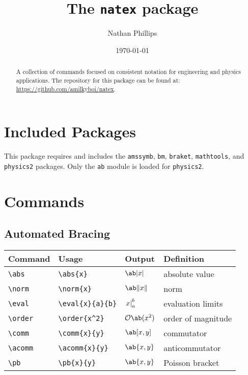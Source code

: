\documentclass[11pt]{article}
\title{The \texttt{natex} package}
\author{Nathan Phillips}
\date{\today}
\begin{document}
\maketitle

\begin{abstract}
    A collection of commands focused on consistent notation for engineering and physics applications. The repository for this package can be found at: \url{https://github.com/amilkyboi/natex}.
\end{abstract}

\tableofcontents

\newpage
\section{Included Packages}

This package requires and includes the \verb|amssymb|, \verb|bm|, \verb|braket|, \verb|mathtools|, and \verb|physics2| packages. Only the \verb|ab| module is loaded for \verb|physics2|.

\newpage
\section{Commands}

\subsection{Automated Bracing}

\begin{tabular}{llll}
    Command       & Usage                 & Output           & Definition         \\
    \hline
    \verb|\abs|   & \verb|\abs{x}|        & $\abs{x}$        & absolute value     \\
    \verb|\norm|  & \verb|\norm{x}|       & $\norm{x}$       & norm               \\
    \verb|\eval|  & \verb|\eval{x}{a}{b}| & $\left.x\right\rvert_{a}^{b}$ & evaluation limits  \\
    \verb|\order| & \verb|\order{x^2}|    & $\order{x^2}$    & order of magnitude \\
    \verb|\comm|  & \verb|\comm{x}{y}|    & $\comm{x}{y}$    & commutator         \\
    \verb|\acomm| & \verb|\acomm{x}{y}|   & $\acomm{x}{y}$   & anticommutator     \\
    \verb|\pb|    & \verb|\pb{x}{y}|      & $\pb{x}{y}$      & Poisson bracket    \\
\end{tabular}
\end{document}

